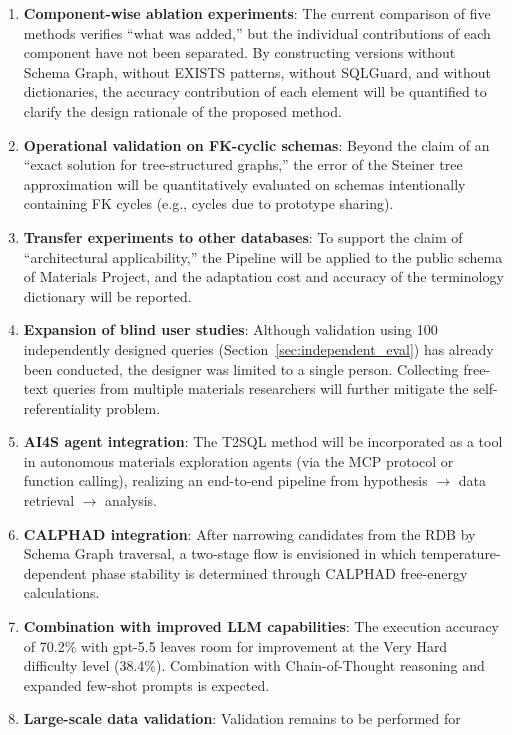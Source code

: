 \documentclass[5p,twocolumn]{elsarticle}
\begin{document}
\begin{enumerate}
  \item \textbf{Component-wise ablation experiments}:
    The current comparison of five methods verifies ``what was added,'' but the individual contributions of each component have not been separated.
    By constructing versions without Schema Graph, without EXISTS patterns, without SQLGuard, and without dictionaries,
    the accuracy contribution of each element will be quantified to clarify the design rationale of the proposed method.
  \item \textbf{Operational validation on FK-cyclic schemas}:
    Beyond the claim of an ``exact solution for tree-structured graphs,'' the error of the Steiner tree approximation will be quantitatively evaluated
    on schemas intentionally containing FK cycles (e.g., cycles due to prototype sharing).
  \item \textbf{Transfer experiments to other databases}:
    To support the claim of ``architectural applicability,''
    the Pipeline will be applied to the public schema of Materials Project,
    and the adaptation cost and accuracy of the terminology dictionary will be reported.
  \item \textbf{Expansion of blind user studies}:
    Although validation using 100 independently designed queries (Section~\ref{sec:independent_eval}) has already been conducted,
    the designer was limited to a single person. Collecting free-text queries from multiple materials researchers
    will further mitigate the self-referentiality problem.
  \item \textbf{AI4S agent integration}: The T2SQL method will be incorporated as a tool
    in autonomous materials exploration agents (via the MCP protocol or function calling),
    realizing an end-to-end pipeline from hypothesis $\to$ data retrieval $\to$ analysis.
  \item \textbf{CALPHAD integration}: After narrowing candidates from the RDB by Schema Graph traversal,
    a two-stage flow is envisioned in which temperature-dependent phase stability is determined
    through CALPHAD free-energy calculations.
  \item \textbf{Combination with improved LLM capabilities}: The execution accuracy of 70.2\% with gpt-5.5
    leaves room for improvement at the Very Hard difficulty level (38.4\%).
    Combination with Chain-of-Thought reasoning and expanded few-shot prompts is expected.
  \item \textbf{Large-scale data validation}: Validation remains to be performed for

\end{enumerate}
\end{document}
